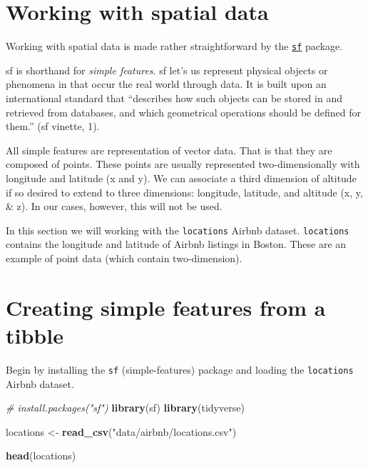\documentclass[
]{book}
\newenvironment{Shaded}{\begin{snugshade}}{\end{snugshade}}
\newcommand{\CommentTok}[1]{\textcolor[rgb]{0.56,0.35,0.01}{\textit{#1}}}
\newcommand{\KeywordTok}[1]{\textcolor[rgb]{0.13,0.29,0.53}{\textbf{#1}}}
\newcommand{\NormalTok}[1]{#1}
\newcommand{\StringTok}[1]{\textcolor[rgb]{0.31,0.60,0.02}{#1}}
\begin{document}
\hypertarget{working-with-spatial-data}{%
\section{Working with spatial data}\label{working-with-spatial-data}}

Working with spatial data is made rather straightforward by the \href{https://github.com/r-spatial/sf}{\texttt{sf}} package.

sf is shorthand for \emph{simple features}. sf let's us represent physical objects or phenomena in that occur the real world through data. It is built upon an international standard that ``describes how such objects can be stored in and retrieved from databases, and which geometrical operations should be defined for them.'' (sf vinette, 1).

All simple features are representation of vector data. That is that they are composed of points. These points are usually represented two-dimensionally with longitude and latitude (x and y). We can associate a third dimension of altitude if so desired to extend to three dimensions: longitude, latitude, and altitude (x, y, \& z). In our cases, however, this will not be used.

In this section we will working with the \texttt{locations} Airbnb dataset. \texttt{locations} contains the longitude and latitude of Airbnb listings in Boston. These are an example of point data (which contain two-dimension).

\hypertarget{creating-simple-features-from-a-tibble}{%
\section{Creating simple features from a tibble}\label{creating-simple-features-from-a-tibble}}

Begin by installing the \texttt{sf} (simple-features) package and loading the \texttt{locations} Airbnb dataset.

\begin{Shaded}
\begin{Highlighting}[]
\CommentTok{\# install.packages("sf")}
\KeywordTok{library}\NormalTok{(sf)}
\KeywordTok{library}\NormalTok{(tidyverse)}

\NormalTok{locations \textless{}{-}}\StringTok{ }\KeywordTok{read\_csv}\NormalTok{(}\StringTok{"data/airbnb/locations.csv"}\NormalTok{)}

\KeywordTok{head}\NormalTok{(locations)}
\end{Highlighting}
\end{Shaded}
\end{document}
